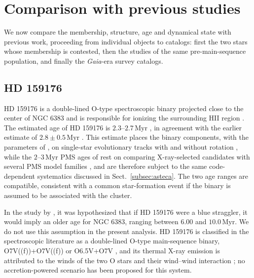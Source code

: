 \documentclass{aa}
\begin{document}
\section{Comparison with previous studies}\label{sec:comparison}
We now compare the membership, structure, age and dynamical state with previous work, proceeding from individual objects to catalogs: first the two stars whose membership is contested, then the studies of the same pre-main-sequence population, and finally the \textit{Gaia}-era survey catalogs.

\subsection{HD 159176}\label{subsubsec:hd159176}
HD 159176 is a double-lined O-type spectroscopic binary projected close to the center of NGC 6383 and is responsible for ionizing the surrounding HII region \citep{1993Obs...113..204S,2007A&A...474..193L,2016ApJ...832..211P}. The estimated age of HD 159176 is $2.3$--$2.7\,\mathrm{Myr}$ \citep{2010AA...511A..25R}, in agreement with the earlier estimate of $2.8\pm0.5\,\mathrm{Myr}$ \citep{1978MNRAS.182..607F}. This estimate places the binary components, with the parameters of \citet{2007A&A...474..193L}, on single-star evolutionary tracks with and without rotation \citep{2003A&A...404..975M}, while the $2$--$3\,\mathrm{Myr}$ PMS ages of \citet{2010AA...511A..25R} rest on comparing X-ray-selected candidates with several PMS model families \citep[e.g.,][]{2000A&A...358..593S}, and are therefore subject to the same code-dependent systematics discussed in Sect.~\ref{subsec:asteca}. The two age ranges are compatible, consistent with a common star-formation event if the binary is assumed to be associated with the cluster.

In the study by \citet{2018AA...610A..30A}, it was hypothesized that if HD 159176 were a blue straggler, it would imply an older age for NGC 6383, ranging between $6.00$ and $10.0\,\mathrm{Myr}$. We do not use this assumption in the present analysis. HD 159176 is classified in the spectroscopic literature as a double-lined O-type main-sequence binary, O7V((f))+O7V((f)) \citep{1993Obs...113..204S,2007A&A...474..193L} or O6.5V+O7V \citep{2016ApJ...832..211P}, and its thermal X-ray emission is attributed to the winds of the two O stars and their wind--wind interaction \citep{2003AA...407..925R,2004A&A...416..221D}; no accretion-powered scenario has been proposed for this system.
\end{document}
